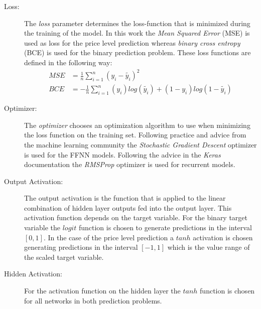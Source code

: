 \begin{description}
\item[Loss:] The \textit{loss} parameter determines the loss-function that is minimized during the training of the model. In this work the \textit{Mean Squared Error} (MSE) is used as loss for the price level prediction whereas \textit{binary cross entropy} (BCE) is used for the binary prediction problem. These loss functions are defined in the following way: \begin{align*}
MSE &= \frac{1}{n}\sum_{i=1}^{n}(y_i - \tilde{y_i})^2 \\
BCE &= -\frac{1}{n}\sum_{i=1}^{n}(y_i)log(\tilde{y_i}) + (1-y_i)log(1-\tilde{y_i})
\end{align*}

\item[Optimizer:] The \textit{optimizer} chooses an optimization algorithm to use when minimizing the loss function on the training set. Following practice and advice from the machine learning community the \textit{Stochastic Gradient Descent} optimizer is used for the FFNN models. Following the advice in the \textit{Keras} documentation the \textit{RMSProp} optimizer is used for recurrent models.

\item[Output Activation:] The output activation is the function that is applied to the linear combination of hidden layer outputs fed into the output layer. This activation function depends on the target variable. For the binary target variable the $logit$ function is chosen to generate predictions in the interval $[0,1]$. In the case of the price level prediction a $tanh$ activation is chosen generating predictions in the interval $[-1,1]$ which is the value range of the scaled target variable.

\item[Hidden Activation:] For the activation function on the hidden layer the $tanh$ function is chosen for all networks in both prediction problems.
\end{description}
